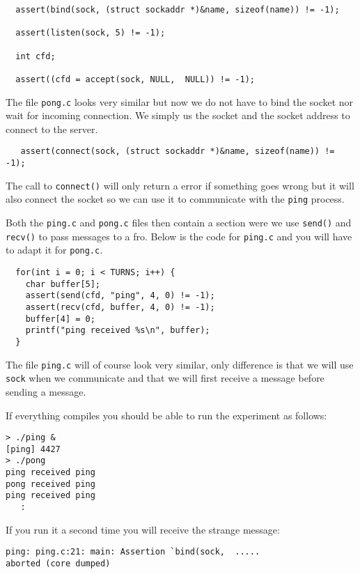 \documentclass[a4paper,11pt]{article}
\begin{document}
\begin{lstlisting}
  assert(bind(sock, (struct sockaddr *)&name, sizeof(name)) != -1);

  assert(listen(sock, 5) != -1);

  int cfd;
  
  assert((cfd = accept(sock, NULL,  NULL)) != -1);
\end{lstlisting}

The file {\tt pong.c} looks very similar but now we do not have to
bind the socket nor wait for incoming connection. We simply us the
socket and the socket address to connect to the server.

\begin{lstlisting}
   assert(connect(sock, (struct sockaddr *)&name, sizeof(name)) != -1);
\end{lstlisting}

The call to {\tt connect()} will only return a error if something goes
wrong but it will also connect the socket so we can use it to
communicate with the {\tt ping} process.

Both the {\tt ping.c} and {\tt pong.c} files then contain a section
were we use {\tt send()} and {\tt recv()} to pass messages to a
fro. Below is the code for {\tt ping.c} and you will have to adapt it
for {\tt pong.c}. 

\begin{lstlisting}
  for(int i = 0; i < TURNS; i++) {
    char buffer[5];
    assert(send(cfd, "ping", 4, 0) != -1);
    assert(recv(cfd, buffer, 4, 0) != -1);
    buffer[4] = 0;
    printf("ping received %s\n", buffer);
  }
\end{lstlisting}

The file {\tt ping.c} will of course look very similar, only
difference is that we will use {\tt sock} when we communicate and
that we will first receive a message before sending a message.

If everything compiles you should be able to run the experiment as follows:

\begin{verbatim} 
> ./ping &
[ping] 4427
> ./pong
ping received ping
pong received ping
ping received ping
   :
\end{verbatim}

If you run it a second time you will receive the strange message:

\begin{verbatim}
ping: ping.c:21: main: Assertion `bind(sock,  .....
aborted (core dumped)
\end{verbatim}
\end{document}
